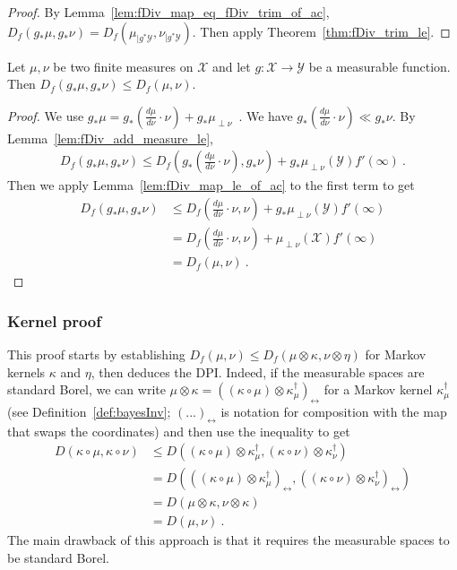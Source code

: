 \begin{proof}%
{}
By Lemma~\ref{lem:fDiv_map_eq_fDiv_trim_of_ac},  $D_f(g_* \mu, g_* \nu) = D_f(\mu_{| g^* \mathcal Y}, \nu_{| g^* \mathcal Y})$. Then apply Theorem~\ref{thm:fDiv_trim_le}.
\end{proof}


\begin{theorem}
  \label{thm:fDiv_map_le}
  Let $\mu, \nu$ be two finite measures on $\mathcal X$ and let $g : \mathcal X \to \mathcal Y$ be a measurable function. Then
  $D_f(g_* \mu, g_* \nu) \le D_f(\mu, \nu)$.
\end{theorem}

\begin{proof}%
{}
We use $g_*\mu = g_*(\frac{d\mu}{d\nu}\cdot \nu) + g_*\mu_{\perp \nu}$~. 
We have $g_*(\frac{d\mu}{d\nu}\cdot \nu) \ll g_*\nu$.
By Lemma~\ref{lem:fDiv_add_measure_le},
\begin{align*}
D_f(g_* \mu, g_* \nu)
\le D_f\left(g_*(\frac{d\mu}{d\nu}\cdot \nu), g_*\nu\right)
  + g_*\mu_{\perp \nu}(\mathcal Y) f'(\infty)
\: .
\end{align*}
Then we apply Lemma~\ref{lem:fDiv_map_le_of_ac} to the first term to get
\begin{align*}
D_f(g_* \mu, g_* \nu)
&\le D_f\left(\frac{d\mu}{d\nu}\cdot \nu, \nu\right)
  + g_*\mu_{\perp \nu}(\mathcal Y) f'(\infty)
\\
&= D_f\left(\frac{d\mu}{d\nu}\cdot \nu, \nu\right)
  + \mu_{\perp \nu}(\mathcal X) f'(\infty)
\\
&= D_f(\mu, \nu)
\: .
\end{align*}
\end{proof}


\subsubsection{Kernel proof}

This proof starts by establishing $D_f(\mu, \nu) \le D_f(\mu \otimes \kappa, \nu \otimes \eta)$ for Markov kernels $\kappa$ and $\eta$, then deduces the DPI.
Indeed, if the measurable spaces are standard Borel, we can write $\mu \otimes \kappa = ((\kappa \circ \mu) \otimes \kappa^\dagger_\mu)_\leftrightarrow$ for a Markov kernel $\kappa^\dagger_\mu$ (see Definition~\ref{def:bayesInv}; $(...)_\leftrightarrow$ is notation for composition with the map that swaps the coordinates) and then use the inequality to get
\begin{align*}
D(\kappa \circ \mu, \kappa \circ \nu)
&\le D((\kappa \circ \mu) \otimes \kappa^\dagger_\mu, (\kappa \circ \nu) \otimes \kappa^\dagger_\nu)
\\
&= D(((\kappa \circ \mu) \otimes \kappa^\dagger_\mu)_{\leftrightarrow}, ((\kappa \circ \nu) \otimes \kappa^\dagger_\nu)_{\leftrightarrow})
\\
&= D(\mu \otimes \kappa, \nu \otimes \kappa)
\\
&= D(\mu, \nu)
\: .
\end{align*}
The main drawback of this approach is that it requires the measurable spaces to be standard Borel.

